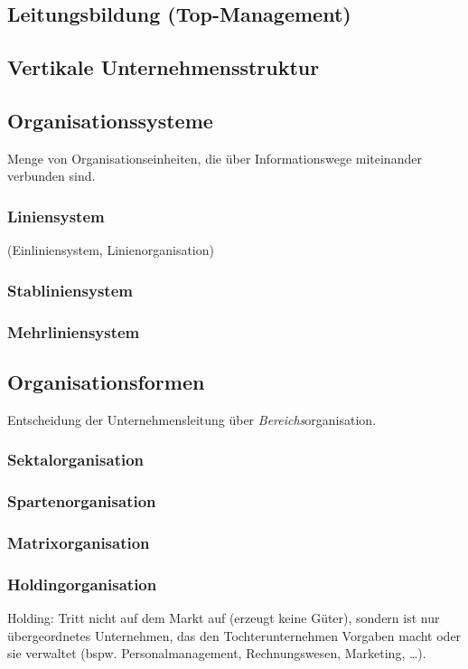 \subsection{Leitungsbildung (Top-Management)}
\subsection{Vertikale Unternehmensstruktur}
\subsection{Organisationssysteme}
Menge von Organisationseinheiten, die über Informationswege miteinander verbunden sind.
\subsubsection{Liniensystem}
(Einliniensystem, Linienorganisation)
\subsubsection{Stabliniensystem}
\subsubsection{Mehrliniensystem}

\subsection{Organisationsformen}
Entscheidung der Unternehmensleitung über \emph{Bereichs}organisation.
\subsubsection{Sektalorganisation}
\subsubsection{Spartenorganisation}
\subsubsection{Matrixorganisation}
\subsubsection{Holdingorganisation}
Holding: Tritt nicht auf dem Markt auf (erzeugt keine Güter), sondern ist nur übergeordnetes Unternehmen, das den Tochterunternehmen Vorgaben macht oder sie verwaltet (bspw. Personalmanagement, Rechnungswesen, Marketing, …). 
